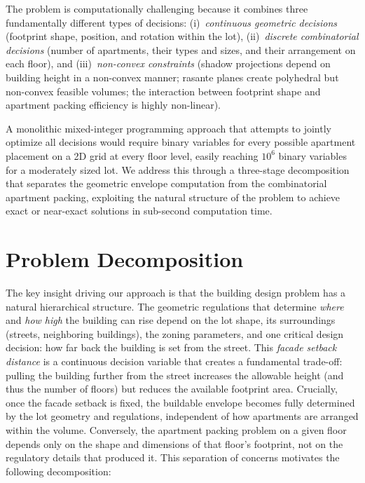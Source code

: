 \documentclass[11pt,a4paper]{article}
\begin{document}
The problem is computationally challenging because it combines three
fundamentally different types of decisions:
(i)~\emph{continuous geometric decisions} (footprint shape, position, and
rotation within the lot),
(ii)~\emph{discrete combinatorial decisions} (number of apartments, their
types and sizes, and their arrangement on each floor), and
(iii)~\emph{non-convex constraints} (shadow projections depend on building
height in a non-convex manner; rasante planes create polyhedral but
non-convex feasible volumes; the interaction between footprint shape and
apartment packing efficiency is highly non-linear).

A monolithic mixed-integer programming approach that attempts to jointly
optimize all decisions would require binary variables for every possible
apartment placement on a 2D grid at every floor level, easily reaching
$10^6$ binary variables for a moderately sized lot. We address this through
a three-stage decomposition that separates the geometric envelope
computation from the combinatorial apartment packing, exploiting the
natural structure of the problem to achieve exact or near-exact solutions
in sub-second computation time.


\section{Problem Decomposition}\label{sec:decomposition}

The key insight driving our approach is that the building design problem
has a natural hierarchical structure. The geometric regulations that
determine \emph{where} and \emph{how high} the building can rise depend
on the lot shape, its surroundings (streets, neighboring buildings),
the zoning parameters, and one critical design decision: how far back
the building is set from the street. This \emph{facade setback distance}
is a continuous decision variable that creates a fundamental trade-off:
pulling the building further from the street increases the allowable
height (and thus the number of floors) but reduces the available
footprint area. Crucially, once the facade setback is fixed, the
buildable envelope becomes fully determined by the lot geometry and
regulations, independent of how apartments are arranged within the
volume. Conversely, the apartment packing problem on a given floor
depends only on the shape and dimensions of that floor's footprint,
not on the regulatory details that produced it. This separation of
concerns motivates the following decomposition:
\end{document}
